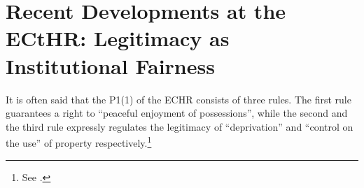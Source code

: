

\section{Recent Developments at the ECtHR: Legitimacy as Institutional Fairness}\label{sec:echr}

It is often said that the P1(1) of the ECHR consists of three rules. The first rule guarantees a right to ``peaceful enjoyment of possessions'', while the second and the third rule expressly regulates the legitimacy of ``deprivation'' and ``control on the use'' of property respectively.\footnote{See \cite[61]{sporrong82}.}

